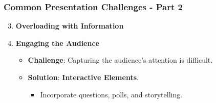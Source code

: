 \documentclass[aspectratio=169]{beamer}
\begin{document}
\begin{frame}[fragile]
    \frametitle{Common Presentation Challenges - Part 2}
    \begin{enumerate}
        \setcounter{enumii}{2} %
        \item \textbf{Overloading with Information}
        \item \textbf{Engaging the Audience}
          \begin{itemize}
            \item \textbf{Challenge}: Capturing the audience's attention is difficult.
            \item \textbf{Solution}: \textbf{Interactive Elements}.
            \begin{itemize}
                \item Incorporate questions, polls, and storytelling.
            \end{itemize}
        \end{itemize}
    \end{enumerate}
\end{frame}
\end{document}
